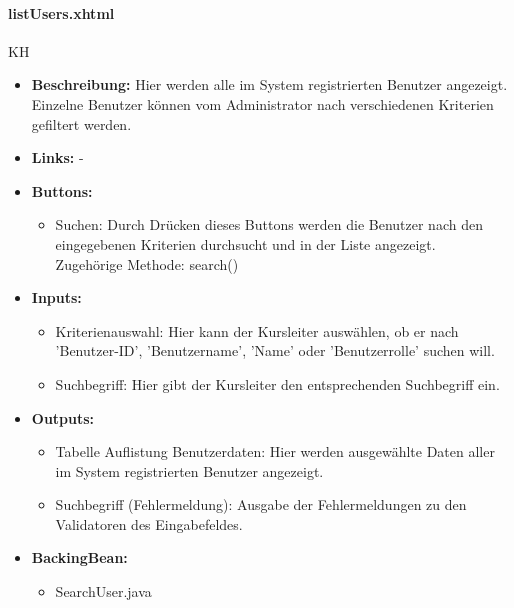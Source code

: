 				\paragraph{listUsers.xhtml}
					KH\\
					\begin{itemize}
						\item \textbf{Beschreibung:} Hier werden alle im System registrierten Benutzer angezeigt. Einzelne Benutzer können vom Administrator nach verschiedenen Kriterien gefiltert werden. 
						\item \textbf{Links:} -
						\item \textbf{Buttons:}
						\begin{itemize}
							\item Suchen: Durch Drücken dieses Buttons werden die Benutzer nach den eingegebenen Kriterien durchsucht und in der Liste angezeigt. \\ Zugehörige Methode: search()
						\end{itemize}
						\item \textbf{Inputs:}
						\begin{itemize}
							\item Kriterienauswahl: Hier kann der Kursleiter auswählen, ob er nach 'Benutzer-ID', 'Benutzername', 'Name' oder 'Benutzerrolle' suchen will.
							\item Suchbegriff: Hier gibt der Kursleiter den entsprechenden Suchbegriff ein.
						\end{itemize}
						\item \textbf{Outputs:}
						\begin{itemize}
							\item Tabelle Auflistung Benutzerdaten: Hier werden ausgewählte Daten aller im System registrierten Benutzer angezeigt.
							\item Suchbegriff (Fehlermeldung): Ausgabe der Fehlermeldungen zu den Validatoren des Eingabefeldes.
						\end{itemize}
						\item \textbf{BackingBean:}
						\begin{itemize}
							\item SearchUser.java
						\end{itemize}
					\end{itemize}
				
